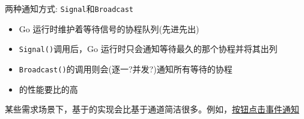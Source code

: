 \begin{frame}{两种通知方式: \texttt{Signal}和\texttt{Broadcast}}
   \begin{itemize}
       \item Go 运行时维护着等待信号的协程队列(先进先出)
       \item \texttt{Signal()}调用后，Go 运行时只会通知等待最久的那个协程并将其出列
       \item \texttt{Broadcast()}的调用则会(逐一?并发?)通知所有等待的协程
       \item \Cond 的性能要比\channel 的高
   \end{itemize} 

   某些需求场景下，基于\Cond 的实现会比基于通道\channel 简洁很多。例如，\href{https://github.com/sammyne/concurrency-in-go/blob/master/chapter03/sync.pkg/cond/boardcast.go}{按钮点击事件通知}
\end{frame}
